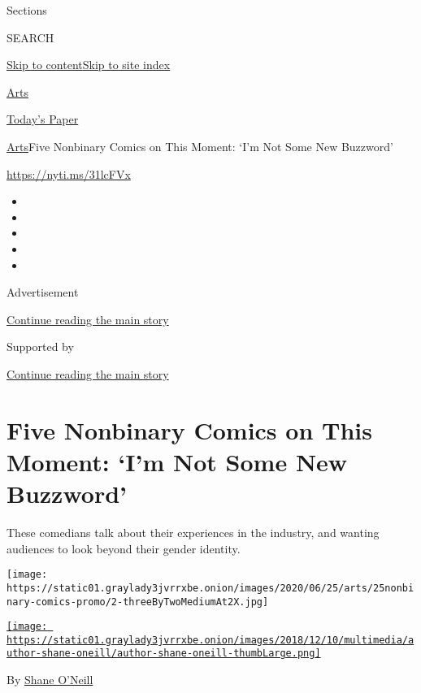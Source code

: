 Sections

SEARCH

\protect\hyperlink{site-content}{Skip to
content}\protect\hyperlink{site-index}{Skip to site index}

\href{https://www.nytimes3xbfgragh.onion/section/arts}{Arts}

\href{https://myaccount.nytimes3xbfgragh.onion/auth/login?response_type=cookie\&client_id=vi}{}

\href{https://www.nytimes3xbfgragh.onion/section/todayspaper}{Today's
Paper}

\href{/section/arts}{Arts}\textbar{}Five Nonbinary Comics on This
Moment: `I'm Not Some New Buzzword'

\url{https://nyti.ms/31lcFVx}

\begin{itemize}
\item
\item
\item
\item
\item
\end{itemize}

Advertisement

\protect\hyperlink{after-top}{Continue reading the main story}

Supported by

\protect\hyperlink{after-sponsor}{Continue reading the main story}

\hypertarget{five-nonbinary-comics-on-this-moment-im-not-some-new-buzzword}{%
\section{Five Nonbinary Comics on This Moment: `I'm Not Some New
Buzzword'}\label{five-nonbinary-comics-on-this-moment-im-not-some-new-buzzword}}

These comedians talk about their experiences in the industry, and
wanting audiences to look beyond their gender identity.

\texttt{[image: https://static01.graylady3jvrrxbe.onion/images/2020/06/25/arts/25nonbinary-comics-promo/2-threeByTwoMediumAt2X.jpg]}

\href{https://www.nytimes3xbfgragh.onion/by/shane-oneill}{\texttt{[image: https://static01.graylady3jvrrxbe.onion/images/2018/12/10/multimedia/author-shane-oneill/author-shane-oneill-thumbLarge.png]}}

By \href{https://www.nytimes3xbfgragh.onion/by/shane-oneill}{Shane
O'Neill}

